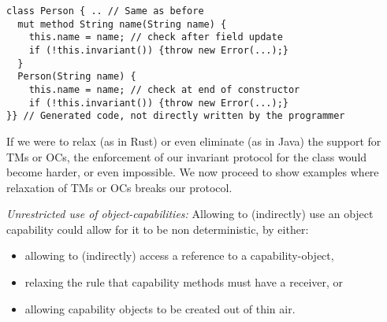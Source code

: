 
\begin{lstlisting}
class Person { .. // Same as before
  mut method String name(String name) {
    this.name = name; // check after field update
    if (!this.invariant()) {throw new Error(...);} 
  }
  Person(String name) {
    this.name = name; // check at end of constructor
    if (!this.invariant()) {throw new Error(...);}
}} // Generated code, not directly written by the programmer
\end{lstlisting}


\noindent If we were to relax (as in Rust) or even eliminate (as in Java) the support for TMs or OCs, the enforcement of our invariant protocol for the \Q@Person@ class would become harder, or even impossible. We now proceed to show examples where
relaxation of TMs or OCs breaks our protocol. 

\loseSpace
\noindent\textit{Unrestricted use of object-capabilities:}
Allowing \validate{} to (indirectly) use an object capability could allow for it to be non deterministic, by either:
\begin{itemize}
\item allowing \validate{} to (indirectly) access a \Q@mut@ reference to a capability-object,
\item relaxing the rule that capability methods must have a \Q@mut@ receiver, or
\item allowing capability objects to be created out of thin air.
\end{itemize}

